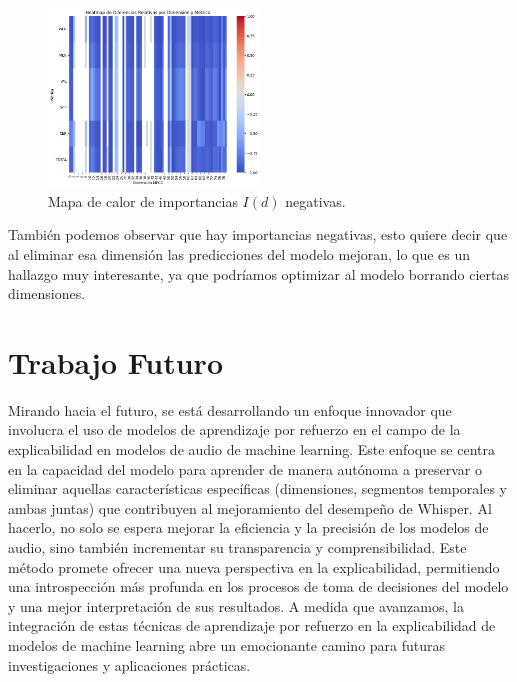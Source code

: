 \documentclass[conference]{IEEEtran}
\begin{document}
\begin{figure}[H]
\centering
\includegraphics[width=0.5\textwidth]{images/negative_importance.png}
\caption{Mapa de calor de importancias $I(d)$ negativas.}
\label{fig:cv_imp_neg}
\end{figure}

También podemos observar que hay importancias negativas, esto quiere decir que al eliminar esa dimensión las predicciones del modelo mejoran, lo que es un hallazgo muy interesante, ya que podríamos optimizar al modelo borrando ciertas dimensiones.




\section{Trabajo Futuro} \label{7-Future-Work}
Mirando hacia el futuro, se está desarrollando un enfoque innovador que involucra el uso de modelos de aprendizaje por refuerzo en el campo de la explicabilidad en modelos de audio de machine learning. Este enfoque se centra en la capacidad del modelo para aprender de manera autónoma a preservar o eliminar aquellas características específicas (dimensiones, segmentos temporales y ambas juntas) que contribuyen al mejoramiento del desempeño de Whisper. Al hacerlo, no solo se espera mejorar la eficiencia y la precisión de los modelos de audio, sino también incrementar su transparencia y comprensibilidad. Este método promete ofrecer una nueva perspectiva en la explicabilidad, permitiendo una introspección más profunda en los procesos de toma de decisiones del modelo y una mejor interpretación de sus resultados. A medida que avanzamos, la integración de estas técnicas de aprendizaje por refuerzo en la explicabilidad de modelos de machine learning abre un emocionante camino para futuras investigaciones y aplicaciones prácticas.
\end{document}

